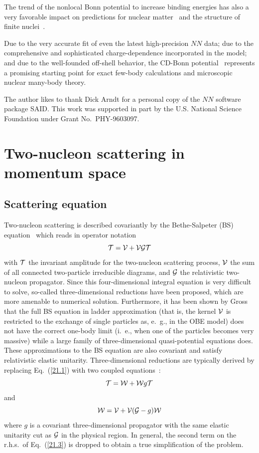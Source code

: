 The trend of the nonlocal Bonn potential to increase binding
energies has also a very favorable impact on predictions for
nuclear matter~\cite{Mac99a,Mac98} and the
structure of finite nuclei~\cite{Jia92,And96,Hol98}.

Due to the very accurate fit of even the latest high-precision $NN$ data;
due to the comprehensive and sophisticated charge-dependence incorporated
in the model; and due to the well-founded off-shell behavior,
the CD-Bonn potential~\cite{foot4} represents a promising starting point
for exact few-body calculations and
microscopic nuclear many-body theory.






\acknowledgments
The author likes to thank Dick Arndt for a personal 
copy of the $NN$ software package SAID.
This work was supported in part by the U.S. National Science Foundation
under Grant No.~PHY-9603097. 



\appendix

\section{Two-nucleon scattering in momentum space}
\subsection{Scattering equation}
Two-nucleon scattering is described covariantly by
 the Bethe-Salpeter (BS) equation~\cite{SB51}
which reads in operator notation
\begin{equation}
{\cal T=V+VGT}
\label{21.1}
\end{equation}
with ${\cal T}$ the invariant amplitude for the two-nucleon scattering process,
${\cal V}$ the sum of all connected two-particle irreducible diagrams, and 
${\cal G}$ the relativistic two-nucleon propagator. Since this four-dimensional
integral equation is very difficult to solve, so-called 
three-dimensional reductions have been proposed, which are more amenable to
numerical solution.
Furthermore, it has been shown by Gross~\cite{Gro82} that the full BS equation 
in ladder approximation (that is, the kernel ${\cal V}$ is restricted to 
the exchange of single particles as, e.~g., in the OBE model)
does not have the correct one-body limit (i.~e., 
when one of the particles becomes very massive) while a large family 
of three-dimensional quasi-potential equations does.
 These approximations to the BS equation are also covariant
and satisfy relativistic elastic unitarity.
Three-dimensional reductions are typically derived by replacing 
Eq.~(\ref{21.1}) with two coupled equations~\cite{WJ73}:
\begin{equation}
{\cal T=W+W}g{\cal T}
\label{21.2}
\end{equation}
and
\begin{equation}
{\cal W=V+V(G}-g){\cal W}
\label{21.3}
\end{equation}
where $g$ is a covariant three-dimensional propagator
with the same elastic unitarity cut as ${\cal G}$ in the physical region.
 In general, 
the second term on the r.h.s.\ of Eq.\ (\ref{21.3}) is dropped to obtain a true
simplification of the  problem.


